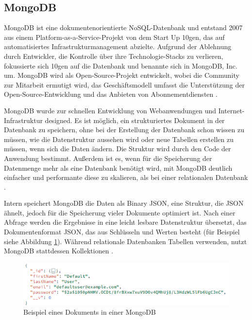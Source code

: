 \subsection{MongoDB}
MongoDB ist eine dokumentenorientierte NoSQL-Datenbank und entstand 2007 aus einem Platform-as-a-Service-Projekt von dem Start Up 10gen, das auf automatisiertes Infrastrukturmanagement abzielte. 
Aufgrund der Ablehnung durch Entwickler, die Kontrolle über ihre Technologie-Stacks zu verlieren, fokussierte sich 10gen auf die Datenbank und benannte sich in MongoDB, Inc. um. 
MongoDB wird als Open-Source-Projekt entwickelt, wobei die Community zur Mitarbeit ermutigt wird, das Geschäftsmodell umfasst die Unterstützung der Open-Source-Entwicklung und das Anbieten von Abonnementdiensten \cite[S.5 f.]{Banker2016MongoDB}.

MongoDB wurde zur schnellen Entwicklung von Webanwendungen und Internet-Infrastruktur designed. 
Es ist möglich, ein strukturiertes Dokument in der Datenbank zu speichern, ohne bei der Erstellung der Datenbank schon wissen zu müssen, wie die Datenstruktur aussehen wird oder neue Tabellen erstellen zu müssen, wenn sich die Daten ändern. 
Die Struktur wird durch den Code der Anwendung bestimmt. Außerdem ist es, wenn für die Speicherung der Datenmenge mehr als eine Datenbank benötigt wird, mit MongoDB deutlich einfacher und performante diese zu skalieren, als bei einer relationalen Datenbank \cite[S.4 ff.]{Banker2016MongoDB}. 

Intern speichert MongoDB die Daten als Binary \ac{JSON}, eine Struktur, die JSON ähnelt, jedoch für die Speicherung vieler Dokumente optimiert ist. 
Nach einer Abfrage werden die Ergebnisse in eine leicht lesbare Datenstruktur übersetzt, das Dokumentenformat JSON, das aus Schlüsseln und Werten besteht (für Beispiel siehe Abbildung \ref{MongoDB_Document}). 
Während relationale Datenbanken Tabellen verwenden, nutzt MongoDB stattdessen Kollektionen \cite[S.7]{Banker2016MongoDB}.

\begin{figure}[h]
    \centering
    \includegraphics[clip,width=0.z5\linewidth]{images/MongoDB_Document.png}
    \caption[Beispiel eines Dokuments in einer MongoDB]{Beispiel eines Dokuments in einer MongoDB}
    \label{MongoDB_Document}
\end{figure}


